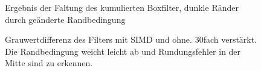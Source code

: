 \documentclass[a4paper,12pt]{article}
\begin{document}
\begin{figure}[htbp]
\caption{Ergebnis der Faltung des kumulierten Boxfilter, dunkle Ränder durch
geänderte Randbedingung}%
\label{figure_hist_kumuBox}
\end{figure}

\begin{figure}[htbp]
\caption{Grauwertdifferenz des Filters mit SIMD und ohne. 30fach verstärkt. Die
Randbedingung weicht leicht ab und Rundungsfehler in der Mitte sind zu erkennen. }%
\label{figure_hist_simd}
\end{figure}
\end{document}
